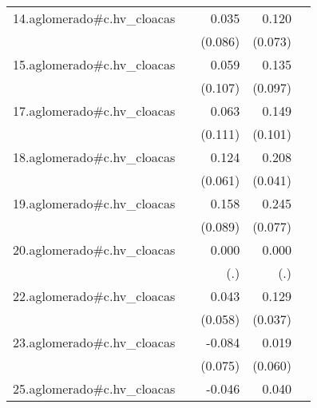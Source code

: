 {\begin{longtable}{l*{4}{D{.}{.}{-1}}}
\addlinespace
14.aglomerado#c.hv\_cloacas&                     &       0.035         &       0.120         &                     \\
            &                     &     (0.086)         &     (0.073)         &                     \\
\addlinespace
15.aglomerado#c.hv\_cloacas&                     &       0.059         &       0.135         &                     \\
            &                     &     (0.107)         &     (0.097)         &                     \\
\addlinespace
17.aglomerado#c.hv\_cloacas&                     &       0.063         &       0.149         &                     \\
            &                     &     (0.111)         &     (0.101)         &                     \\
\addlinespace
18.aglomerado#c.hv\_cloacas&                     &       0.124\sym{*}  &       0.208\sym{***}&                     \\
            &                     &     (0.061)         &     (0.041)         &                     \\
\addlinespace
19.aglomerado#c.hv\_cloacas&                     &       0.158         &       0.245\sym{**} &                     \\
            &                     &     (0.089)         &     (0.077)         &                     \\
\addlinespace
20.aglomerado#c.hv\_cloacas&                     &       0.000         &       0.000         &                     \\
            &                     &         (.)         &         (.)         &                     \\
\addlinespace
22.aglomerado#c.hv\_cloacas&                     &       0.043         &       0.129\sym{***}&                     \\
            &                     &     (0.058)         &     (0.037)         &                     \\
\addlinespace
23.aglomerado#c.hv\_cloacas&                     &      -0.084         &       0.019         &                     \\
            &                     &     (0.075)         &     (0.060)         &                     \\
\addlinespace
25.aglomerado#c.hv\_cloacas&                     &      -0.046         &       0.040         &                     \\

\end{longtable}}
